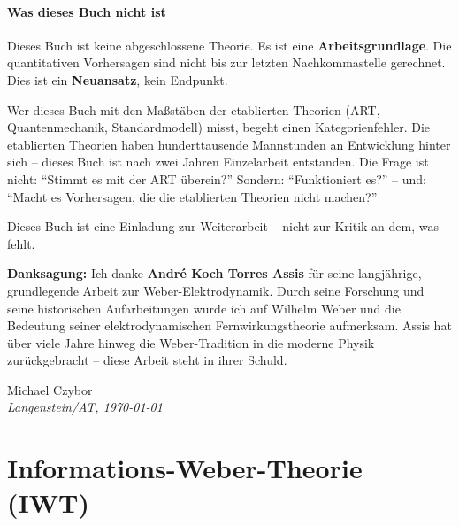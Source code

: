 \documentclass[11pt,a4paper]{book}
\begin{document}
\vspace{0.3cm}
\noindent

\subsection*{Was dieses Buch nicht ist}
Dieses Buch ist keine abgeschlossene Theorie. Es ist eine \textbf{Arbeitsgrundlage}. Die quantitativen Vorhersagen sind nicht bis zur letzten Nachkommastelle
gerechnet. Dies ist ein \textbf{Neuansatz}, kein Endpunkt.

Wer dieses Buch mit den Maßstäben der etablierten Theorien (ART, Quantenmechanik, Standardmodell) misst, begeht einen Kategorienfehler. Die etablierten
Theorien haben hunderttausende Mannstunden an Entwicklung hinter sich – dieses Buch ist nach zwei Jahren Einzelarbeit entstanden. Die Frage ist nicht:
\enquote{Stimmt es mit der ART überein?} Sondern: \enquote{Funktioniert es?} – und: \enquote{Macht es Vorhersagen, die die etablierten Theorien nicht machen?}

Dieses Buch ist eine Einladung zur Weiterarbeit – nicht zur Kritik an dem, was fehlt.

\vspace{0.3cm}
\noindent
\textbf{Danksagung:} Ich danke \textbf{André Koch Torres Assis} für seine langjährige, grundlegende Arbeit zur Weber-Elektrodynamik. Durch seine Forschung
und seine historischen Aufarbeitungen wurde ich auf Wilhelm Weber und die Bedeutung seiner elektrodynamischen Fernwirkungstheorie aufmerksam. Assis hat
über viele Jahre hinweg die Weber-Tradition in die moderne Physik zurückgebracht – diese Arbeit steht in ihrer Schuld.

\vspace{0.5cm}

\begin{flushright}
    Michael Czybor \\
    \emph{Langenstein/AT, \today}
\end{flushright}

\tableofcontents

\part{Informations-Weber-Theorie (IWT)}
\label{part:iwt}








\end{document}

